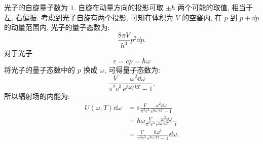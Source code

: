 \begin{questions}
\begin{solution}
    光子的自旋量子数为 $1$. 自旋在动量方向的投影可取 $\pm\hbar$ 两个可能的取值, 相当于左, 右偏振. 考虑到光子自旋有两个投影, 可知在体积为 $V$ 的空窖内, 在 $p$ 到 $p+\dd p$ 的动量范围内, 光子的量子态数为:
    \begin{equation}
      \frac{8\pi V}{h^3} p^2 \dd p.
    \end{equation}
    对于光子
    \begin{equation}
      \varepsilon = cp = \hbar \omega
    \end{equation}
    将光子的量子态数中的 $p$ 换成 $\omega$, 可得量子态数为:
    \begin{equation}
      \frac{V}{\pi^2c^3} \frac{\omega^2\dd \omega}{e^{\hbar\omega/kT} - 1}.
    \end{equation}
    所以辐射场的内能为:
    \begin{equation}
      \begin{aligned}
        U(\omega, T)\dd \omega & = \varepsilon \frac{V}{\pi^2c^3} \frac{\omega^2\dd \omega}{e^{\hbar\omega/kT} - 1}  \\
                               & = \hbar \omega \frac{V}{\pi^2c^3} \frac{\omega^2\dd \omega}{e^{\hbar\omega/kT} - 1} \\
                               & = \frac{V}{\pi^2c^3} \frac{\hbar\omega^3}{e^{\hbar\omega/kT} - 1}\dd \omega.
      \end{aligned}
    \end{equation}
  \end{solution}
\end{questions}

